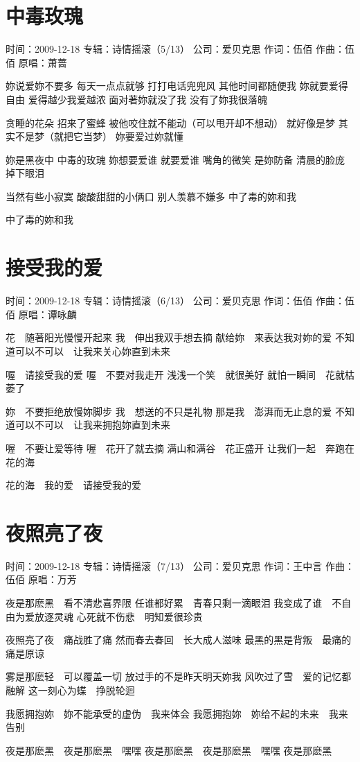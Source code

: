 \documentclass[UTF8,a4paper,oneside,twocolumn,12pt]{ctexbook}
\newcommand{\infopair}[2]{\textbullet #1：#2}
\newcommand{\zc}[1][伍佰]{\infopair{作词}{#1}}
\newcommand{\zq}[1][伍佰]{\infopair{作曲}{#1}}
\newcommand{\zj}[1]{\infopair{专辑}{#1}}
\newcommand{\yc}[1]{\infopair{原唱}{#1}}
\newcommand{\sj}[1]{\infopair{时间}{#1}}
\newcommand{\gs}[1]{\infopair{公司}{#1}}
\newenvironment{info}{\begin{flushleft}\kaishu
	}
	{\end{flushleft}\normalsize\yahei\par}
\newenvironment{lyric}{
	}
{}
\begin{document}
\section{中毒玫瑰}
\begin{info}
	\sj{2009-12-18}
	\zj{诗情摇滚（5/13）}
	\gs{爱贝克思}
	\zc
	\zq
	\yc{萧蔷}
\end{info}
\begin{lyric}
	妳说爱妳不要多 每天一点点就够
	打打电话兜兜风 其他时间都随便我
	妳就要爱得自由 爱得越少我爱越浓
	面对著妳就没了我 没有了妳我很落魄

	贪睡的花朵 招来了蜜蜂
	被他咬住就不能动（可以甩开却不想动）
	就好像是梦 其实不是梦（就把它当梦）
	妳要爱过妳就懂

	妳是黑夜中 中毒的玫瑰
	妳想要爱谁 就要爱谁
	嘴角的微笑 是妳防备
	清晨的脸庞 掉下眼泪

	当然有些小寂寞 酸酸甜甜的小俩口
	别人羡慕不嫌多 中了毒的妳和我

	中了毒的妳和我
\end{lyric}

\section{接受我的爱}
\begin{info}
	\sj{2009-12-18}
	\zj{诗情摇滚（6/13）}
	\gs{爱贝克思}
	\zc
	\zq
	\yc{谭咏麟}
\end{info}
\begin{lyric}
	花　随著阳光慢慢开起来
	我　伸出我双手想去摘
	献给妳　来表达我对妳的爱
	不知道可以不可以　让我来关心妳直到未来

	喔　请接受我的爱
	喔　不要对我走开
	浅浅一个笑　就很美好
	就怕一瞬间　花就枯萎了

	妳　不要拒绝放慢妳脚步
	我　想送的不只是礼物
	那是我　澎湃而无止息的爱
	不知道可以不可以　让我来拥抱妳直到未来

	喔　不要让爱等待
	喔　花开了就去摘
	满山和满谷　花正盛开
	让我们一起　奔跑在花的海

	花的海　我的爱　请接受我的爱
\end{lyric}

\section{夜照亮了夜}
\begin{info}
	\sj{2009-12-18}
	\zj{诗情摇滚（7/13）}
	\gs{爱贝克思}
	\zc[王中言]
	\zq
	\yc{万芳}
\end{info}
\begin{lyric}
	夜是那麽黑　看不清悲喜界限
	任谁都好累　青春只剩一滴眼泪
	我变成了谁　不自由为爱放逐灵魂
	心死就不伤悲　明知爱很珍贵

	夜照亮了夜　痛战胜了痛
	然而春去春回　长大成人滋味
	最黑的黑是背叛　最痛的痛是原谅

	雾是那麽轻　可以覆盖一切
	放过手的不是昨天明天妳我
	风吹过了雪　爱的记忆都融解
	这一刻心为蝶　挣脱轮迴

	我愿拥抱妳　妳不能承受的虚伪　我来体会
	我愿拥抱妳　妳给不起的未来　我来告别

	夜是那麽黑　夜是那麽黑　嘿嘿
	夜是那麽黑　夜是那麽黑　嘿嘿
	夜是那麽黑
\end{lyric}
\end{document}

